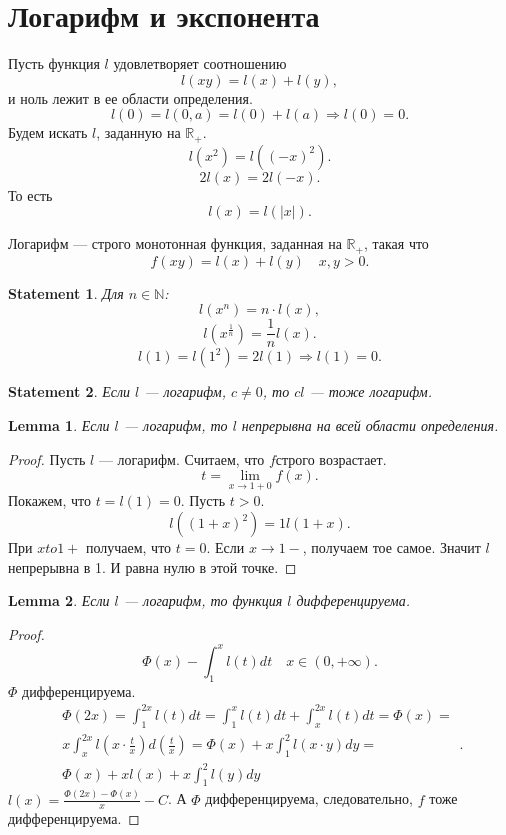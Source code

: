 \documentclass[11pt]{book}
\newcommand{\N}{\mathbb{N}}
\newcommand{\R}{\mathbb{R}}
\theoremstyle{definition}
\theoremstyle{plain}
\theoremstyle{plain}
\newtheorem*{lm}{Lemma}
\newtheorem*{st}{Statement}
\theoremstyle{definition}
\theoremstyle{remark}
\begin{document}
\section{Логарифм и экспонента}
Пусть функция $ l$ удовлетворяет соотношению
\[
    l(xy) = l(x)+l(y)
,\]
и ноль лежит в ее области определения.
\[
    l(0) = l(0, a) = l(0) + l(a) \Longrightarrow l(0) = 0
.\]
Будем искать $ l$, заданную на $ \R_{+}$.
\[
    l(x^2) = l((-x)^2)
.\]
\[
    2l(x) = 2 l(-x)
.\]
То есть \[
    l(x) = l(|x|)
.\]
\begin{defn}
    Логарифм --- строго монотонная функция, заданная на $ \R_{+}$, такая что \[
	f(xy) = l(x) + l(y) \quad x, y >0
    .\]
\end{defn}
\begin{st}
    Для $ n \in  \N$:
    \[
	l(x^{n}) = n\cdot l(x)
    ,\]
    \[
	l(x^{\frac{1}{n}}) = \frac{1}{n} l(x)
    .\]
    \[
	l(1) = l(1^2) = 2 l(1) \Longrightarrow l(1) = 0
    .\]
\end{st}
\begin{st}
    Если $ l$ --- логарифм, $ c\ne 0$, то $ cl$ --- тоже логарифм.
\end{st}
\begin{lm}
    Если $ l$ --- логарифм, то $ l$   непрерывна на всей области определения.
\end{lm}
\begin{proof}
    Пусть $ l$ --- логарифм. Считаем, что $ f$строго возрастает.
    \[
	t = \lim_{x \to 1 + 0} f(x)
    .\]
    Покажем, что $ t = l(1) = 0$.
    Пусть  $ t>0$. \[
	l((1+ x)^{2}) = 1 l(1+ x)
    .\]
    При $ x to 1+$ получаем, что $ t=0$.
    Если  $ x \to  1-$, получаем тое самое. Значит $l$   непрерывна в 1.
    И равна нулю в этой точке.
\end{proof}
\begin{lm}
    Если $ l$ --- логарифм, то функция $ l$   дифференцируема.
\end{lm}
\begin{proof}
    \[
	\Phi (x) - \int_1^{x}l(t) dt \quad x \in  (0, + \infty)
    .\]
    $ \Phi$  дифференцируема.
    \[
	\begin{array}{cc}
	    \Phi(2x) = \int_1^{2x} l(t) dt = \int_1^{x}  l(t) dt + \int_x^{2x}l(t) dt = \Phi(x) = \\
	    x \int_x^{2x} l(x \cdot \frac{t}{x}) d(\frac{t}{x}) = \Phi (x) + x \int_1 ^{2} l(x \cdot y) dy = \\
	    \Phi(x) + x l(x) + x \int_1^{2} l(y) dy
	\end{array}
    .\]
    $ l(x) = \frac{\Phi(2x) -\Phi(x) }{x} - C$.
    А $ \Phi$  дифференцируема, следовательно, $ f$  тоже дифференцируема.
\end{proof}
\end{document}
